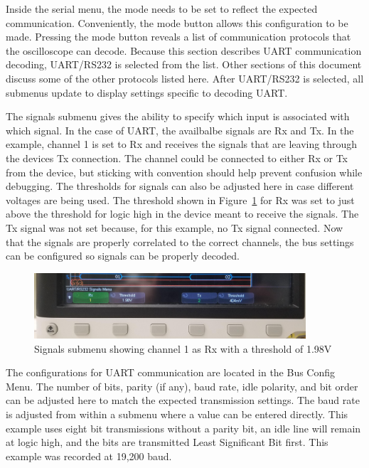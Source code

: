 \documentclass{article}
\begin{document}
  Inside the serial menu, the mode needs to be set to reflect the expected
  communication. Conveniently, the mode button allows this configuration to be
  made. Pressing the mode button reveals a list of communication protocols that
  the oscilloscope can decode. Because this section describes UART communication
  decoding, UART/RS232 is selected from the list. Other sections of this
  document discuss some of the other protocols listed here. After UART/RS232 is
  selected, all submenus update to display settings
  specific to decoding UART.\@

  The signals submenu gives the ability to specify which input is associated
  with which signal. In the case of UART, the availbalbe signals are Rx and Tx.
  In the example, channel 1 is set to Rx and receives the signals that are
  leaving through the devices Tx connection. The channel could be connected to
  either Rx or Tx from the device, but sticking with convention should help
  prevent confusion while debugging. The thresholds for signals can also be
  adjusted here in case different voltages are being used. The threshold shown
  in Figure~\ref{fig:uart_signals_menu} for Rx was set to just above the
  threshold for logic high in the device meant to receive the signals. The Tx
  signal was not set because, for this example, no Tx signal connected. Now that
  the signals are properly correlated to the correct channels, the bus settings
  can be configured so signals can be properly decoded.

  \begin{figure}[h]
    \centering
    \includegraphics[width=0.9\textwidth]{images/uart/signals_menu.jpg}
    \caption{Signals submenu showing channel 1 as Rx with a threshold of 1.98V}
    \label{fig:uart_signals_menu}
  \end{figure}

  The configurations for UART communication are located in the Bus Config Menu.
  The number of bits, parity (if any), baud rate, idle polarity, and bit order
  can be adjusted here to match the expected transmission settings. The baud
  rate is adjusted from within a submenu where a value can be entered directly.
  This example uses eight bit transmissions without a parity bit, an idle line
  will remain at logic high, and the bits are transmitted Least Significant
  Bit first. This example was recorded at 19,200 baud.
\end{document}
